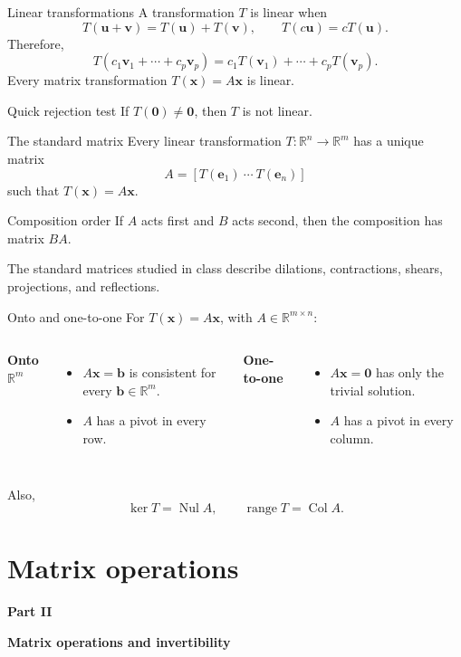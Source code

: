 \documentclass[aspectratio=169]{beamer}
\newcommand{\R}{\mathbb{R}}
\newcommand{\vect}[1]{\mathbf{#1}}
\newcommand{\Col}{\operatorname{Col}}
\newcommand{\Nul}{\operatorname{Nul}}
\newcommand{\sectioncard}[2]{%
  \begin{frame}[plain]
    \vfill\centering
    {\Huge\color{lectureorange}\bfseries #1}\par\bigskip
    {\LARGE\color{lecturegreen}\bfseries #2}
    \vfill
  \end{frame}}
\begin{document}
\begin{frame}{Linear transformations}
A transformation $T$ is linear when
\[
T(\vect u+\vect v)=T(\vect u)+T(\vect v),
\qquad
T(c\vect u)=cT(\vect u).
\]
Therefore,
\[
T(c_1\vect v_1+\cdots+c_p\vect v_p)
=c_1T(\vect v_1)+\cdots+c_pT(\vect v_p).
\]
Every matrix transformation $T(\vect x)=A\vect x$ is linear.
\begin{alertblock}{Quick rejection test}
If $T(\vect0)\ne\vect0$, then $T$ is not linear.
\end{alertblock}
\end{frame}

\begin{frame}{The standard matrix}
Every linear transformation $T:\R^n\to\R^m$ has a unique matrix
\[
A=[T(\vect e_1)\ \cdots\ T(\vect e_n)]
\]
such that $T(\vect x)=A\vect x$.
\begin{block}{Composition order}
If $A$ acts first and $B$ acts second, then the composition has matrix $BA$.
\end{block}
The standard matrices studied in class describe dilations, contractions, shears, projections, and reflections.
\end{frame}

\begin{frame}{Onto and one-to-one}
For $T(\vect x)=A\vect x$, with $A\in\R^{m\times n}$:
\begin{columns}[T]
\textbf{Onto $\R^m$}
\begin{itemize}
  \item $A\vect x=\vect b$ is consistent for every $\vect b\in\R^m$.
  \item $A$ has a pivot in every row.
\end{itemize}
\textbf{One-to-one}
\begin{itemize}
  \item $A\vect x=\vect0$ has only the trivial solution.
  \item $A$ has a pivot in every column.
\end{itemize}
\end{columns}
Also,
\[
\ker T=\Nul A,
\qquad
\operatorname{range}T=\Col A.
\]
\end{frame}

\section{Matrix operations}
\sectioncard{Part II}{Matrix operations and invertibility}
\end{document}
